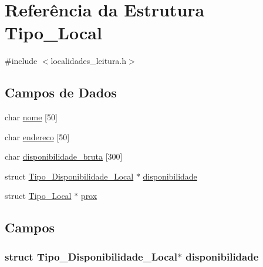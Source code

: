 \hypertarget{struct_tipo___local}{}\section{Referência da Estrutura Tipo\+\_\+\+Local}
\label{struct_tipo___local}


{\ttfamily \#include $<$localidades\+\_\+leitura.\+h$>$}

\subsection*{Campos de Dados}
\begin{DoxyCompactItemize}
\item 
char \hyperlink{struct_tipo___local_ad9b32a94f9054fd81f59b1118b8d53d2}{nome} \mbox{[}50\mbox{]}
\item 
char \hyperlink{struct_tipo___local_a16f3ac8554441c8caab646a362ad2e35}{endereco} \mbox{[}50\mbox{]}
\item 
char \hyperlink{struct_tipo___local_a683bf37aaa0892f657c2263c1a4bdd92}{disponibilidade\+\_\+bruta} \mbox{[}300\mbox{]}
\item 
struct \hyperlink{struct_tipo___disponibilidade___local}{Tipo\+\_\+\+Disponibilidade\+\_\+\+Local} $\ast$ \hyperlink{struct_tipo___local_a4bd687741089a5762f6c5ac6f190dfa9}{disponibilidade}
\item 
struct \hyperlink{struct_tipo___local}{Tipo\+\_\+\+Local} $\ast$ \hyperlink{struct_tipo___local_af88870599f755b0ce0fff7e6e72c167f}{prox}
\end{DoxyCompactItemize}


\subsection{Campos}
\hypertarget{struct_tipo___local_a4bd687741089a5762f6c5ac6f190dfa9}{}
\subsubsection[{disponibilidade}]{\setlength{\rightskip}{0pt plus 5cm}struct {\bf Tipo\+\_\+\+Disponibilidade\+\_\+\+Local}$\ast$ disponibilidade}\label{struct_tipo___local_a4bd687741089a5762f6c5ac6f190dfa9}
\hypertarget{struct_tipo___local_a683bf37aaa0892f657c2263c1a4bdd92}{}
